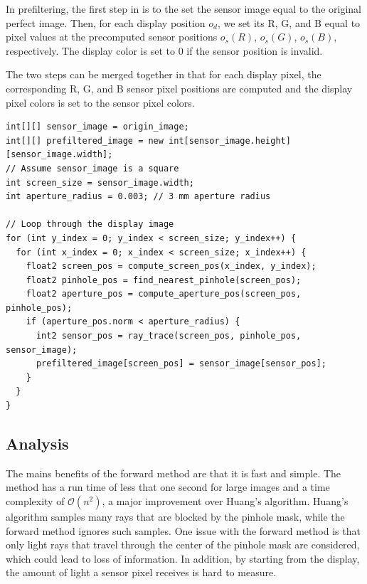 In prefiltering, the first step in is to the set the sensor image equal to the original perfect image. Then, for each display position $o_d$, we set its R, G, and B equal to pixel values at the precomputed sensor positions $o_s(R)$, $o_s(G)$, $o_s(B)$, respectively. The display color is set to $0$ if the sensor position is invalid.

The two steps can be merged together in that for each display pixel, the corresponding R, G, and B sensor pixel positions are computed and the display pixel colors is set to the sensor pixel colors. 

\lstset {language=C++}
\begin{lstlisting}[frame=single, basicstyle=\footnotesize\ttfamily, columns=fullflexible, caption=Pseudocode For Forward Method \protect\footnote{The R, G, and B channels are ignored for simplicity.}]
int[][] sensor_image = origin_image;
int[][] prefiltered_image = new int[sensor_image.height][sensor_image.width];
// Assume sensor_image is a square
int screen_size = sensor_image.width;
int aperture_radius = 0.003; // 3 mm aperture radius

// Loop through the display image
for (int y_index = 0; y_index < screen_size; y_index++) {
  for (int x_index = 0; x_index < screen_size; x_index++) {
    float2 screen_pos = compute_screen_pos(x_index, y_index);
    float2 pinhole_pos = find_nearest_pinhole(screen_pos);
    float2 aperture_pos = compute_aperture_pos(screen_pos, pinhole_pos);
    if (aperture_pos.norm < aperture_radius) {
      int2 sensor_pos = ray_trace(screen_pos, pinhole_pos, sensor_image);
      prefiltered_image[screen_pos] = sensor_image[sensor_pos];
    }
  }
}
\end{lstlisting}

\subsection{Analysis}
The mains benefits of the forward method are that it is fast and simple. The method has a run time of less that one second for large images and a time complexity of $\mathcal{O}(n^2)$, a major improvement over Huang's algorithm. Huang's algorithm samples many rays that are blocked by the pinhole mask, while the forward method ignores such samples. One issue with the forward method is that only light rays that travel through the center of the pinhole mask are considered, which could lead to loss of information. In addition, by starting from the display, the amount of light a sensor pixel receives is hard to measure.


